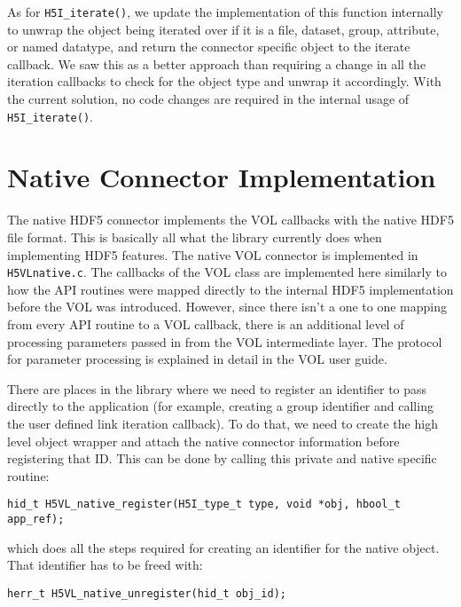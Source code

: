 As for {\tt H5I\_iterate()}, we update the implementation of this function internally to unwrap the object being iterated over if it is a file, dataset, group, attribute, or named datatype, and return the connector specific object to the iterate callback. We saw this as a better approach than requiring a change in all the iteration callbacks to check for the object type and unwrap it accordingly. With the current solution, no code changes are required in the internal usage of {\tt H5I\_iterate()}.

\section{Native Connector Implementation}
The native HDF5 connector implements the VOL callbacks with the native HDF5 file format. This is basically all what the library currently does when implementing HDF5 features. The native VOL connector is implemented in {\tt H5VLnative.c}. The callbacks of the VOL class are implemented here similarly to how the API routines were mapped directly to the internal HDF5 implementation before the VOL was introduced. However, since there isn't a one to one mapping from every API routine to a VOL callback, there is an additional level of processing parameters passed in from the VOL intermediate layer. The protocol for parameter processing is explained in detail in the VOL user guide.

There are places in the library where we need to register an identifier to pass directly to the application (for example, creating a group identifier and calling the user defined link iteration callback). To do that, we need to create the high level object wrapper and attach the native connector information before registering that ID. This can be done by calling this private and native specific routine:
\begin{lstlisting}
hid_t H5VL_native_register(H5I_type_t type, void *obj, hbool_t app_ref);
\end{lstlisting}
which does all the steps required for creating an identifier for the native object. That identifier has to be freed with:
\begin{lstlisting}
herr_t H5VL_native_unregister(hid_t obj_id);
\end{lstlisting}

